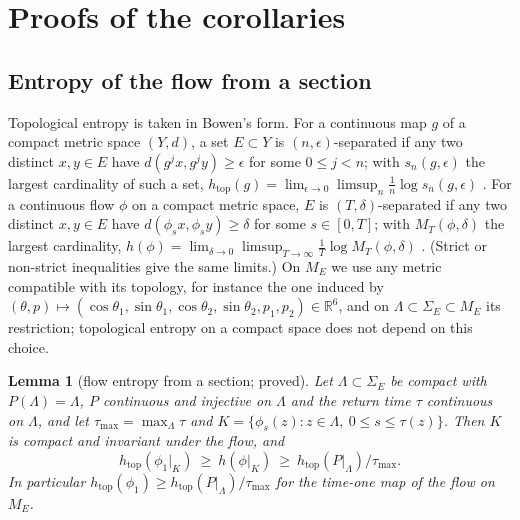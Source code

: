 \documentclass[11pt]{article}
\newtheorem{lemma}{Lemma}
\theoremstyle{definition}
\newcommand{\R}{\mathbb{R}}
\newcommand{\htop}{h_{\mathrm{top}}}
\begin{document}
\section{Proofs of the corollaries}\label{sec:cor}

\subsection{Entropy of the flow from a section}

Topological entropy is taken in Bowen's form. For a continuous map $g$ of a compact metric space $(Y, d)$, a set $E \subset Y$ is $(n, \epsilon)$-separated if any two distinct $x, y \in E$ have $d(g^jx, g^jy) \ge \epsilon$ for some $0 \le j < n$; with $s_n(g, \epsilon)$ the largest cardinality of such a set, $\htop(g) = \lim_{\epsilon \to 0}\limsup_{n}\frac1n\log s_n(g, \epsilon)$ \cite[Sect.~7.2]{walters1982}. For a continuous flow $\phi$ on a compact metric space, $E$ is $(T, \delta)$-separated if any two distinct $x, y \in E$ have $d(\phi_sx, \phi_sy) \ge \delta$ for some $s \in [0, T]$; with $M_T(\phi, \delta)$ the largest cardinality, $h(\phi) = \lim_{\delta \to 0}\limsup_{T \to \infty}\frac1T\log M_T(\phi, \delta)$ \cite[p.~185]{bw1972}. (Strict or non-strict inequalities give the same limits.) On $M_E$ we use any metric compatible with its topology, for instance the one induced by $(\theta, p) \mapsto (\cos\theta_1, \sin\theta_1, \cos\theta_2, \sin\theta_2, p_1, p_2) \in \R^6$, and on $\Lambda \subset \Sigma_E \subset M_E$ its restriction; topological entropy on a compact space does not depend on this choice.

\begin{lemma}[flow entropy from a section; proved]\label{lem:flowent}
Let $\Lambda \subset \Sigma_E$ be compact with $P(\Lambda) = \Lambda$, $P$ continuous and injective on $\Lambda$ and the return time $\tau$ continuous on $\Lambda$, and let $\tau_{\max} = \max_\Lambda\tau$ and $K = \{\phi_s(z) : z \in \Lambda,\ 0 \le s \le \tau(z)\}$. Then $K$ is compact and invariant under the flow, and
\[
  \htop(\phi_1|_K) \ \ge\ h(\phi|_K) \ \ge\ \htop(P|_\Lambda)/\tau_{\max} .
\]
In particular $\htop(\phi_1) \ge \htop(P|_\Lambda)/\tau_{\max}$ for the time-one map of the flow on $M_E$.
\end{lemma}
\end{document}
